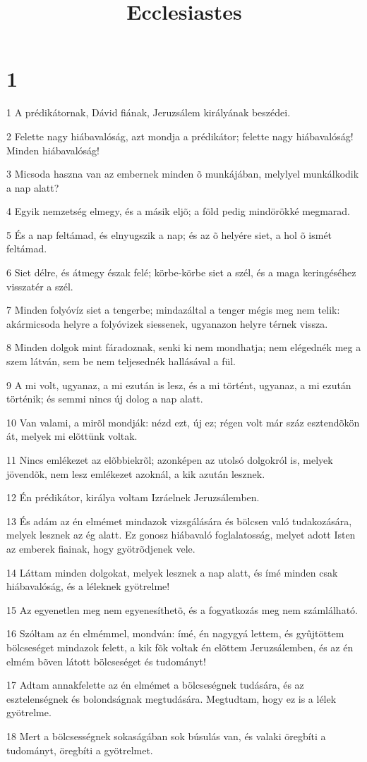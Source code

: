 

\title{Ecclesiastes}


\chapter{1}

\par 1 A prédikátornak, Dávid fiának, Jeruzsálem  királyának beszédei.
\par 2 Felette nagy hiábavalóság, azt mondja a prédikátor; felette nagy hiábavalóság! Minden hiábavalóság!
\par 3 Micsoda haszna van az embernek minden õ munkájában, melylyel munkálkodik a nap alatt?
\par 4 Egyik nemzetség elmegy, és a másik eljõ; a föld pedig mindörökké megmarad.
\par 5 És a nap feltámad, és elnyugszik a nap; és az õ helyére siet, a hol õ ismét feltámad.
\par 6 Siet délre, és átmegy észak felé; körbe-körbe siet a szél, és a maga keringéséhez visszatér a szél.
\par 7 Minden folyóvíz siet a tengerbe; mindazáltal a tenger mégis meg nem telik: akármicsoda helyre a folyóvizek siessenek, ugyanazon helyre térnek vissza.
\par 8 Minden dolgok mint fáradoznak, senki ki nem mondhatja; nem elégednék meg a szem látván, sem be nem teljesednék hallásával a fül.
\par 9 A mi volt, ugyanaz, a mi ezután is lesz, és a mi történt, ugyanaz, a mi ezután történik; és semmi nincs új dolog a nap alatt.
\par 10 Van valami, a mirõl mondják: nézd ezt, új ez; régen volt már száz esztendõkön át, melyek mi elõttünk voltak.
\par 11 Nincs emlékezet az elõbbiekrõl; azonképen az utolsó dolgokról is, melyek jövendõk, nem lesz emlékezet azoknál, a kik azután lesznek.
\par 12 Én prédikátor, királya voltam Izráelnek Jeruzsálemben.
\par 13 És adám az én elmémet mindazok vizsgálására és bölcsen való tudakozására, melyek lesznek az ég alatt. Ez gonosz hiábavaló foglalatosság, melyet adott Isten az emberek fiainak, hogy gyötrõdjenek vele.
\par 14 Láttam minden dolgokat, melyek lesznek a nap alatt, és ímé minden csak hiábavalóság, és a léleknek gyötrelme!
\par 15 Az egyenetlen meg nem egyenesíthetõ, és a fogyatkozás meg nem számlálható.
\par 16 Szóltam az én elmémmel, mondván: ímé, én nagygyá lettem, és gyûjtöttem bölcseséget mindazok felett, a kik fõk voltak én elõttem Jeruzsálemben, és az én elmém bõven látott bölcseséget és tudományt!
\par 17 Adtam annakfelette az én elmémet a bölcseségnek tudására, és az esztelenségnek és bolondságnak megtudására. Megtudtam, hogy ez is a lélek  gyötrelme.
\par 18 Mert a bölcsességnek sokaságában sok búsulás van, és valaki öregbíti a tudományt, öregbíti a gyötrelmet.

